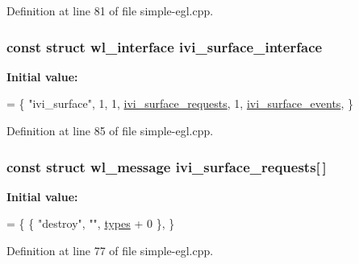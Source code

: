Definition at line 81 of file simple-\/egl.\+cpp.

\subsubsection[{\texorpdfstring{ivi\+\_\+surface\+\_\+interface}{ivi_surface_interface}}]{\setlength{\rightskip}{0pt plus 5cm}const struct wl\+\_\+interface ivi\+\_\+surface\+\_\+interface}\hypertarget{simple-egl_8cpp_adf384de8d12d2edd7265ab85fd16b11c}{}\label{simple-egl_8cpp_adf384de8d12d2edd7265ab85fd16b11c}
{\bfseries Initial value\+:}
\begin{DoxyCode}
= \{
        \textcolor{stringliteral}{"ivi\_surface"}, 1,
        1, \hyperlink{simple-egl_8cpp_ada80120c5590d2821da9babef808b98d}{ivi\_surface\_requests},
        1, \hyperlink{simple-egl_8cpp_ac848f4fbf712a9ba414272fa85577791}{ivi\_surface\_events},
\}
\end{DoxyCode}


Definition at line 85 of file simple-\/egl.\+cpp.

\subsubsection[{\texorpdfstring{ivi\+\_\+surface\+\_\+requests}{ivi_surface_requests}}]{\setlength{\rightskip}{0pt plus 5cm}const struct wl\+\_\+message ivi\+\_\+surface\+\_\+requests\mbox{[}$\,$\mbox{]}\hspace{0.3cm}{\ttfamily [static]}}\hypertarget{simple-egl_8cpp_ada80120c5590d2821da9babef808b98d}{}\label{simple-egl_8cpp_ada80120c5590d2821da9babef808b98d}
{\bfseries Initial value\+:}
\begin{DoxyCode}
= \{
        \{ \textcolor{stringliteral}{"destroy"}, \textcolor{stringliteral}{""}, \hyperlink{simple-egl_8cpp_aea3203db9e218d3e5d60bdb4ebe2fa1f}{types} + 0 \},
\}
\end{DoxyCode}


Definition at line 77 of file simple-\/egl.\+cpp.

